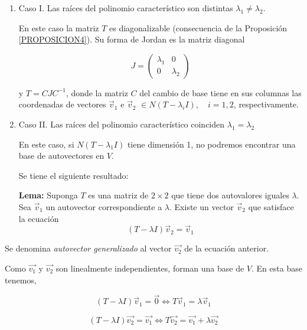\begin{enumerate}

\item  Caso I.  Las raíces del polinomio característico son distintas $\lambda_1\neq\lambda_2$. 

En este caso la matriz $T$ es diagonalizable (consecuencia de la Proposición \ref{PROPOSICION4}). Su forma de Jordan es la matriz diagonal 

$$J=\left(\begin{array}{cc}  \lambda_1 & 0  \\ 0 &  \lambda_2
\end{array}
\right)$$
\bigskip

y $T= CJC^{-1}$, donde la matriz $C$ del cambio de base tiene en sus columnas las coordenadas de vectores $\vec{v}_1$ e $\vec{v}_2$ $\in N(T-\lambda_i I ), \quad i=1,2$, respectivamente.

\bigskip



\item  Caso II.  Las raíces del polinomio característico coinciden $\lambda_1=\lambda_2$

 En este caso, si $N(T-\lambda_1 I )$ tiene dimensión 1, no podremos encontrar una base de autovectores en $V$. 

\bigskip

Se tiene el siguiente resultado:

\bigskip

\textbf{Lema:}
Suponga  $T$ es una matriz de $2 \times 2$  que tiene dos autovalores iguales $\lambda$. Sea  $\vec{v}_1$ un autovector correspondiente a $\lambda$. Existe un vector $\vec{v}_2$ que satisface la ecuación $$(T-\lambda I)\vec{v}_2=\vec{v}_1$$

\end{enumerate}
\bigskip

\begin{definition}\label{autgen}
Se denomina \textit{autovector generalizado} al vector $\vec{v_2}$ de la ecuación anterior. 
\end{definition}
\bigskip

 Como $\vec{v_1}$ y  $\vec{v_2}$ son linealmente independientes, forman una base de $V$. En esta base tenemos,

$$(T-\lambda I ) \vec{v}_1=\vec{0} \Leftrightarrow T \vec{v}_1 =\lambda \vec{v}_1$$

\bigskip

$$(T-\lambda I ) \vec{v_2}= \vec{v_1} \Leftrightarrow T \vec{v_2} =   \vec{v_1} + \lambda \vec{v_2}$$

